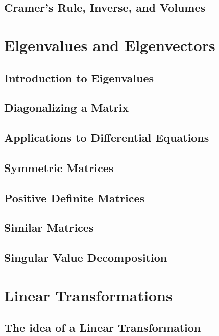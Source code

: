 \documentclass{book}
\begin{document}
\section{Cramer's Rule, Inverse, and Volumes}








\chapter{Elgenvalues and Elgenvectors}
\section{Introduction to Eigenvalues}

\section{Diagonalizing a Matrix}

\section{Applications to Differential Equations}

\section{Symmetric Matrices}

\section{Positive Definite Matrices}

\section{Similar Matrices}

\section{Singular Value Decomposition}








\chapter{Linear Transformations}
\section{The idea of a Linear Transformation}
\end{document}
